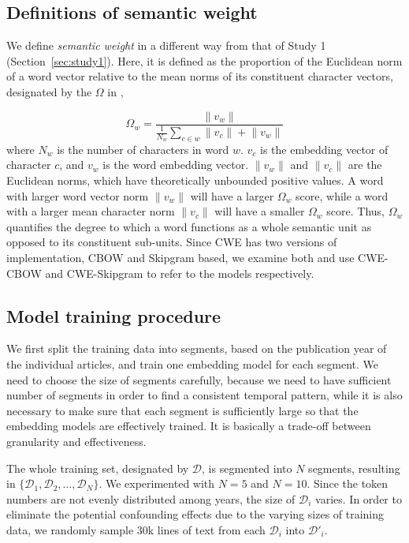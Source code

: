 \documentclass[output=paper]{langsci/langscibook}
\begin{document}
\subsection{Definitions of semantic weight}
We define \emph{semantic weight} in a different way from that of Study 1 (Section~\ref{sec:study1}). Here, it is defined as the proportion of the Euclidean norm of a word vector relative to the mean norms of its constituent character vectors, designated by the $\Omega$ in ,

\begin{equation}\label{eq:semantic_weight_def2}
	\Omega_{w} = \frac{\lVert v_{w} \rVert}{\frac{1}{N_w}\sum_{c \in w}\lVert v_{c} \rVert + \lVert v_{w} \rVert}
\end{equation}
where $N_w$ is the number of characters in word $w$. $v_c$ is the embedding vector of character $c$, and $v_w$ is the word embedding vector. $\lVert v_w \rVert$ and $\lVert v_c \rVert$ are the Euclidean norms, which have theoretically unbounded positive values. 
A word with larger word vector norm $\lVert v_w \rVert$ will have a larger $\Omega_{w}$ score, while a word with a larger mean character norm $\lVert v_c \rVert$ will have a smaller $\Omega_{w}$ score.
Thus, $\Omega_w$ quantifies the degree to which a word functions as a whole semantic unit as opposed to its constituent sub-units. 
Since CWE has two versions of implementation, CBOW and Skipgram based, we examine both and use CWE-CBOW and CWE-Skipgram to refer to the models respectively.


\subsection{Model training procedure}
We first split the training data into segments, based on the publication year of the individual articles, and train one embedding model for each segment. 
We need to choose the size of segments carefully, because we need to have sufficient number of segments in order to find a consistent temporal pattern, while it is also necessary to make sure that each segment is sufficiently large so that the embedding models are effectively trained. It is basically a trade-off between granularity and effectiveness. 

The whole training set, designated by $\mathcal{D}$, is segmented into $N$ segments, resulting in $\{\mathcal{D}_1,\mathcal{D}_2,\dots,\mathcal{D}_N\}$. We experimented with $N=5$ and $N=10$. 
Since the token numbers are not evenly distributed among years, the size of $\mathcal{D}_i$ varies. In order to eliminate the potential confounding effects due to the varying sizes of training data, we randomly sample 30k lines of text from each $\mathcal{D}_i$ into $\mathcal{D}'_i$. 
\end{document}
